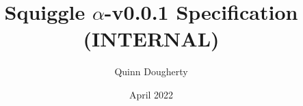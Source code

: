 \documentclass{article}
\title{Squiggle $\alpha$-v0.0.1 Specification (INTERNAL)}
\author{Quinn Dougherty}
\date{April 2022}
\begin{document}
\maketitle{}

\nocite{*}




\printbibliography
\end{document}

